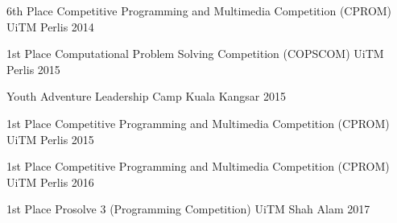 \begin{cvhonors}

  \cvhonor
    {6th Place}
    {Competitive Programming and Multimedia Competition (CPROM)}
    {UiTM Perlis}
    {2014}

  \cvhonor
    {1st Place}
    {Computational Problem Solving Competition (COPSCOM)}
    {UiTM Perlis}
    {2015}

  \cvhonor
    {}
    {Youth Adventure Leadership Camp}
    {Kuala Kangsar}
    {2015}

  \cvhonor
    {1st Place}
    {Competitive Programming and Multimedia Competition (CPROM)}
    {UiTM Perlis}
    {2015}
        
  \cvhonor
    {1st Place}
    {Competitive Programming and Multimedia Competition (CPROM)}
    {UiTM Perlis}
    {2016}

  \cvhonor
    {1st Place}
    {Prosolve 3 (Programming Competition)}
    {UiTM Shah Alam}
    {2017}

\end{cvhonors}
